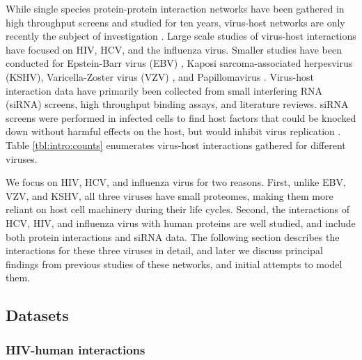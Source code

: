 

While single species protein-protein interaction networks have been
gathered in high throughput screens and studied for ten years,
virus-host networks are only recently the subject of investigation
\cite{mendez2010global}. Large scale studies of virus-host
interactions have focused on HIV, HCV, and the influenza virus.
Smaller studies have been conducted for Epstein-Barr virus (EBV)
\cite{calderwood07}, Kaposi sarcoma-associated herpesvirus (KSHV),
Varicella-Zoster virus (VZV) \cite{uetz2006herpesviral}, and
Papillomavirus \cite{driscoll2009pig}. Virus-host interaction data
have primarily been collected from small interfering RNA (siRNA)
screens, high throughput binding assays, and literature reviews. siRNA
screens were performed in infected cells to find host factors that
could be knocked down without harmful effects on the host, but would
inhibit virus replication \cite{georgel2010virus}. Table
\ref{tbl:intro:counts} enumerates virus-host interactions gathered for
different viruses.



We focus on HIV, HCV, and influenza virus for two reasons. First,
unlike EBV, VZV, and KSHV, all three viruses have small proteomes,
making them more reliant on host cell machinery during their life
cycles. Second, the interactions of HCV, HIV, and influenza virus with
human proteins are well studied, and include both protein interactions
and siRNA data. The following section describes the interactions for
these three viruses in detail, and later we discuss principal findings
from previous studies of these networks, and initial attempts to model
them.

\subsection{Datasets}

\subsubsection{HIV-human interactions}

